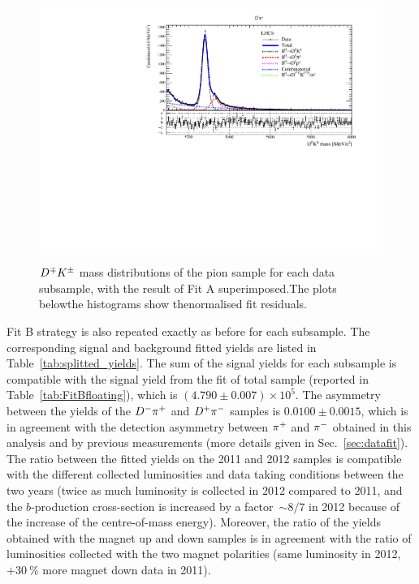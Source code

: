 \begin{figure}[htbp]
\begin{center}
		\includegraphics[width=0.48\linewidth]{03Massfit/figs/MDFitPlots_Bd_pip/MDFit_BeautyMass_Bd2DK_withPulls.pdf} \\
		\vspace{-2mm}
                \caption{$D^\mp K^\pm$ mass distributions of the pion sample for each data subsample, with the result of Fit A
                  superimposed.The plots belowthe histograms show thenormalised fit residuals.
		\label{fig:splitfitK}}
	\end{center}
\end{figure}

Fit B strategy is also repeated exactly as before for each subsample. The
corresponding signal and background fitted yields are listed in
Table~\ref{tab:splitted_yields}. The sum of the signal yields for each subsample
is compatible with the signal yield from the fit of total sample (reported in
Table~\ref{tab:FitBfloating}), which is $(4.790\pm0.007)\times10^{5}$.
The asymmetry between the yields of the $D^-\pi^+$ and $D^+\pi^-$ samples 
is $0.0100\pm0.0015$, which is in agreement with the detection asymmetry between 
$\pi^+$ and $\pi^-$ obtained in this analysis and by previous measurements (more details given in Sec.~\ref{sec:datafit}).
The ratio between the fitted yields on the 2011 and 2012 samples is compatible with the different collected luminosities and data taking conditions 
between the two years (twice as much luminosity is collected in 2012 compared to 2011, and the $b$-production cross-section is increased by a factor~$\sim8/7$ in 2012 
because of the increase of the centre-of-mass energy).
Moreover, the ratio of the yields obtained with the magnet up and down samples is in agreement with the ratio of luminosities collected
with the two magnet polarities (same luminosity in 2012, $+30~\%$ more magnet down data in 2011).

